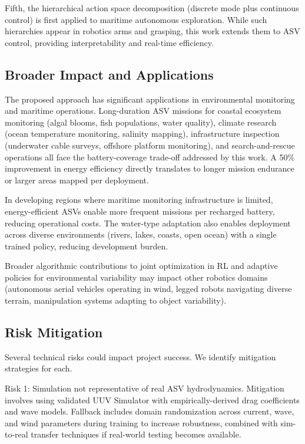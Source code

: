 Fifth, the hierarchical action space decomposition (discrete mode plus continuous control) is first applied to maritime autonomous exploration. While such hierarchies appear in robotics arms and grasping, this work extends them to ASV control, providing interpretability and real-time efficiency.

\subsection{Broader Impact and Applications}

The proposed approach has significant applications in environmental monitoring and maritime operations. Long-duration ASV missions for coastal ecosystem monitoring (algal blooms, fish populations, water quality), climate research (ocean temperature monitoring, salinity mapping), infrastructure inspection (underwater cable surveys, offshore platform monitoring), and search-and-rescue operations all face the battery-coverage trade-off addressed by this work. A 50\% improvement in energy efficiency directly translates to longer mission endurance or larger areas mapped per deployment.

In developing regions where maritime monitoring infrastructure is limited, energy-efficient ASVs enable more frequent missions per recharged battery, reducing operational costs. The water-type adaptation also enables deployment across diverse environments (rivers, lakes, coasts, open ocean) with a single trained policy, reducing development burden.

Broader algorithmic contributions to joint optimization in RL and adaptive policies for environmental variability may impact other robotics domains (autonomous aerial vehicles operating in wind, legged robots navigating diverse terrain, manipulation systems adapting to object variability).

\subsection{Risk Mitigation}

Several technical risks could impact project success. We identify mitigation strategies for each.

Risk 1: Simulation not representative of real ASV hydrodynamics. Mitigation involves using validated UUV Simulator with empirically-derived drag coefficients and wave models. Fallback includes domain randomization across current, wave, and wind parameters during training to increase robustness, combined with sim-to-real transfer techniques if real-world testing becomes available.

